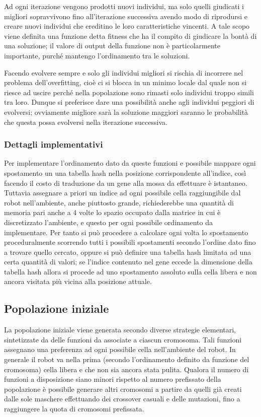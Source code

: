 \documentclass{article}
\begin{document}
Ad ogni iterazione vengono prodotti nuovi individui, ma solo quelli giudicati i migliori sopravvivono fino all'iterazione successiva avendo modo di riprodursi e creare nuovi individui che ereditino le loro caratteristiche vincenti. A tale scopo viene definita una funzione detta fitness che ha il compito di giudicare la bontà di una soluzione; il valore di output della funzione non è particolarmente importante, purché mantengo l'ordinamento tra le soluzioni.

Facendo evolvere sempre e solo gli individui migliori si rischia di incorrere nel problema dell'overfitting, cioè ci si blocca in un minimo locale dal quale non si riesce ad uscire perché nella popolazione sono rimasti solo individui troppo simili tra loro. Dunque si preferisce dare una possibilità anche agli individui peggiori di evolversi; ovviamente migliore sarà la soluzione maggiori saranno le probabilità che questa possa evolversi nella iterazione successiva.

\subsubsection{Dettagli implementativi}
Per implementare l'ordinamento dato da queste funzioni e possibile mappare ogni spostamento un una tabella hash nella posizione corrispondente all'indice, così facendo il costo di traduzione da un gene alla mossa da effettuare è istantaneo. Tuttavia assegnare a priori un indice ad ogni possibile cella raggiungibile dal robot nell'ambiente, anche piuttosto grande, richiederebbe una quantità di memoria pari anche a 4 volte lo spazio occupato dalla matrice in cui è discretizzato l'ambiente, e questo per ogni possibile ordinamento da implementare. Per tanto si può procedere a calcolare ogni volta lo spostamento proceduralmente scorrendo tutti i possibili spostamenti secondo l'ordine dato fino a trovare quello cercato, oppure si può definire una tabella hash limitata ad una certa quantità di valori; se l'indice contenuto nel gene eccede la dimensione della tabella hash allora si procede ad uno spostamento assoluto sulla cella libera e non ancora visitata più vicina alla posizione attuale. 
\subsection{Popolazione iniziale}
La popolazione iniziale viene generata secondo diverse strategie elementari, sintetizzate da delle funzioni da associate a ciascun cromosoma.
Tali funzioni assegnano una preferenza ad ogni possibile cella nell'ambiente del robot. In generale il robot va nella prima (secondo l'ordinamento definito da funzione del cromosoma) cella libera  e che non sia ancora stata pulita.
Qualora il numero di funzioni a disposizione siano minori rispetto al numero prefissato della popolazione è possibile generare altri cromosomi a partire da quelli già creati dalle sole maschere effettuando dei crossover casuali e delle mutazioni, fino a raggiungere la quota di cromosomi prefissata.
\end{document}

